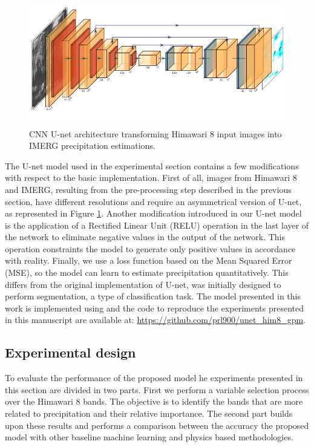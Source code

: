 \documentclass[3p,times]{elsarticle}
\begin{document}
\begin{figure}%
    \includegraphics[width=14cm]{unet.png}
    \caption{CNN U-net architecture transforming Himawari 8 input images into IMERG precipitation estimations.}%
    \label{model_cmp}%
\end{figure}

The U-net model used in the experimental section contains a few modifications with respect to the basic implementation. First of all, images from Himawari 8 and IMERG, resulting from the pre-processing step described in the previous section, have different resolutions and require an asymmetrical version of U-net, as represented in Figure \ref{model_cmp}. Another modification introduced in our U-net model is the application of a Rectified Linear Unit (RELU) operation in the last layer of the network to eliminate negative values in the output of the network. This operation constraints the model to generate only positive values in accordance with reality. Finally, we use a loss function based on the Mean Squared Error (MSE), so the model can learn to estimate precipitation quantitatively. This differs from the original implementation of U-net, was initially designed to perform segmentation, a type of classification task. The model presented in this work is implemented using \citep{chollet2018keras} and the code to reproduce the experiments presented in this manuscript are available at: \href{https://github.com/prl900/unet_him8_gpm}{https://github.com/prl900/unet\_him8\_gpm}.

\subsection{Experimental design}

To evaluate the performance of the proposed model he experiments presented in this section are divided in two parts. First we perform a variable selection process over the Himawari 8 bands. The objective is to identify the bands that are more related to precipitation and their relative importance. The second part builds upon these results and performs a comparison between the accuracy the proposed model with other baseline machine learning and physics based methodologies.
\end{document}
